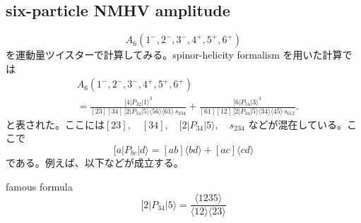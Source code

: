 \documentclass[uplatex,dvipdfmx,a4paper,11pt]{jsarticle}
\numberwithin{equation}{section}
\begin{document}
\subsection{six-particle NMHV amplitude}
\[
A_6(1^-,2^-,3^-,4^+,5^+,6^+)
\]
を運動量ツイスターで計算してみる。spinor-helicity formalism を用いた計算では
\[
\begin{aligned}
&A_6(1^-,2^-,3^-,4^+,5^+,6^+)\\[2pt]
&=
\frac{
[4|P_{32}|1\rangle^{3}
}{
[23][34]\,[2|P_{34}|5\rangle
\langle56\rangle\langle61\rangle\,s_{234}
}
+
\frac{
[6|P_{54}|3\rangle^{3}
}{
[61][12]\,[2|P_{34}|5\rangle
\langle34\rangle\langle45\rangle\,s_{612}
}.
\end{aligned}
\]
と表された。ここには$[23],\quad[34],\quad [2|P_{34}|5\rangle,\quad s_{234}$ などが混在している。ここで
\[
[a|P_{bc}|d\rangle
=
[ab]\langle bd\rangle+[ac]\langle cd\rangle
\]
である。例えば、以下などが成立する。
\begin{mythm}{famous formula}
  \[
[2|P_{34}|5\rangle
=
\frac{\langle1235\rangle}
{\langle12\rangle\langle23\rangle}
\]
\end{mythm}
\end{document}
